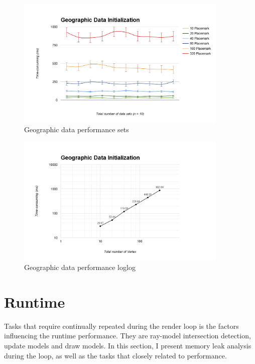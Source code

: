 \begin{figure}[H]
	\caption{Geographic data performance sets}
	\label{fig:geographic-data-performance-sets}
	\centering
	\includegraphics[width=0.9\textwidth, keepaspectratio]{Figures/geographic-data-performance-sets.png}
	\decoRule
\end{figure}

\begin{figure}[H]
	\caption{Geographic data performance loglog}
	\label{fig:geographic-data-performance-loglog}
	\centering
	\includegraphics[width=0.9\textwidth, keepaspectratio]{Figures/geographic-data-performance-loglog.png}
	\decoRule
\end{figure}

\section{Runtime}

Tasks that require continually repeated during the render loop is the factors influencing the runtime performance. They are ray-model intersection detection, update models and draw models. In this section, I present memory leak analysis during the loop, as well as the tasks that closely related to performance.
 
